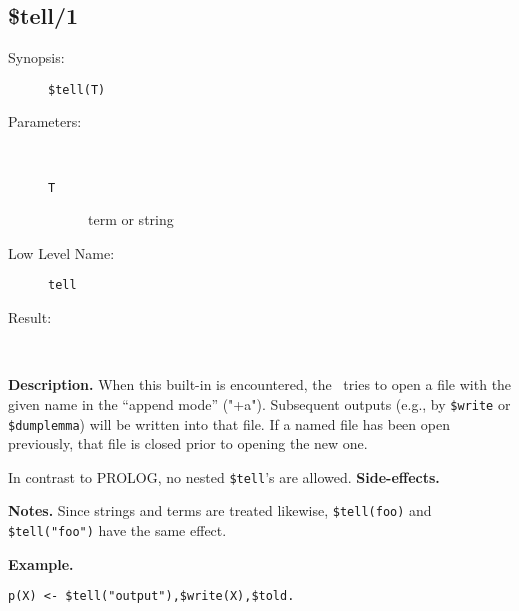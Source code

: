 %
%
%
\subsection{\$tell/1}

\begin{description}
\item[Synopsis:]
	{\tt \$tell(T)}
\item[Parameters:]\ \\[-0.5cm]
	\begin{description}
	\item[{\tt T}] term or string
	\end{description}
\item[Low Level Name:]
	{\tt tell}
\item[Result:]\ \\
\end{description}

\vspace*{0.5cm}
\noindent
{\bf Description.}
When this built-in is encountered, the \SAM\ tries to open a file
with the given name in the ``append mode'' ("+a"). 
Subsequent outputs (e.g., by
{\tt \$write} or {\tt \$dumplemma}) will be written into that file.
If a named file has been open previously, that file is closed prior
to opening the new one.

In contrast to PROLOG, no nested {\tt \$tell}'s are allowed.
\vspace*{0.5cm}
\noindent
{\bf Side-effects.}

\vspace*{0.5cm}
\noindent
{\bf Notes.}
Since strings and terms are treated likewise, {\tt \$tell(foo)} and
{\tt \$tell("foo")} have the same effect.

\vspace*{0.5cm}
\noindent
{\bf Example.}
\begin{verbatim}
p(X) <- $tell("output"),$write(X),$told.
\end{verbatim}


